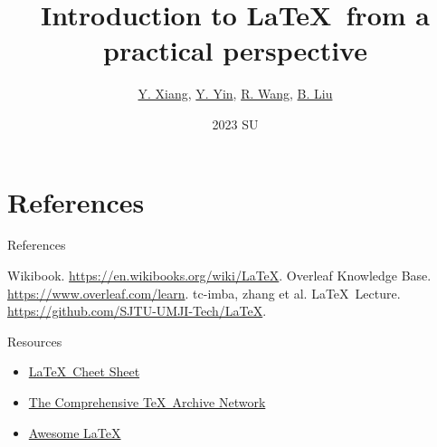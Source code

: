 \documentclass[aspectratio=169]{beamer}
\title{Introduction to \LaTeX\  from a practical perspective}
\author{\hyperlink{https://github.com/linsyking}{Y. Xiang}, \hyperlink{https://github.com/fakefred}{Y. Yin}, \hyperlink{https://github.com/Hydraallen}{R. Wang}, \hyperlink{https://github.com/keke1022}{B. Liu}}
\institute{TechJI}
\date{2023 SU}
\begin{document}
\begin{frame}
    \titlepage
\end{frame}







\section*{References}

\begin{frame}{References}
    \begin{thebibliography}{9}
        Wikibook. \url{https://en.wikibooks.org/wiki/LaTeX}.
        Overleaf Knowledge Base. \url{https://www.overleaf.com/learn}.
        tc-imba, zhang et al. \LaTeX\ Lecture. \url{https://github.com/SJTU-UMJI-Tech/LaTeX}.
    \end{thebibliography}
\end{frame}

\begin{frame}{Resources}
    \begin{itemize}
        \item \href{https://wch.github.io/latexsheet/}{\LaTeX\  Cheet Sheet}
        \item \href{https://www.ctan.org/}{The Comprehensive \TeX\ Archive Network}
        \item \href{https://github.com/egeerardyn/awesome-LaTeX}{Awesome \LaTeX}
    \end{itemize}
\end{frame}
\end{document}
